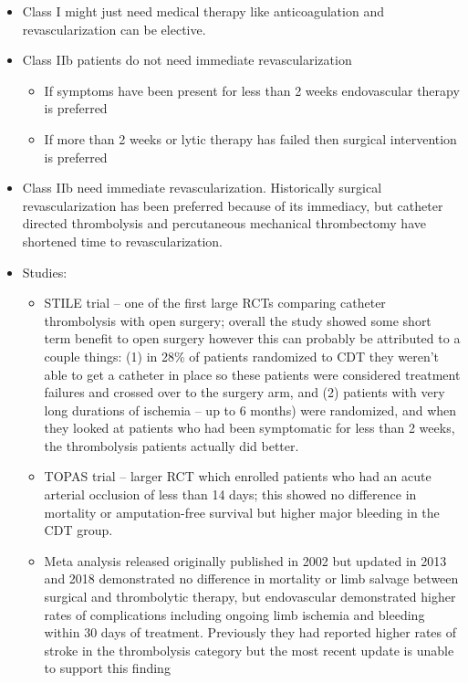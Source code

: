 \documentclass[
]{book}
\begin{document}
\begin{itemize}
\item
  Class I might just need medical therapy like anticoagulation and
  revascularization can be elective.~
\item
  Class IIb patients do not need immediate revascularization

  \begin{itemize}
  \item
    If symptoms have been present for less than 2 weeks endovascular
    therapy is preferred
  \item
    If more than 2 weeks or lytic therapy has failed then surgical
    intervention is preferred~
  \end{itemize}
\item
  Class IIb need immediate revascularization. Historically surgical
  revascularization has been preferred because of its immediacy, but
  catheter directed thrombolysis and percutaneous mechanical
  thrombectomy have shortened time to revascularization.~
\item
  Studies:

  \begin{itemize}
  \item
    STILE trial -- one of the first large RCTs comparing catheter
    thrombolysis with open surgery; overall the study showed some
    short term benefit to open surgery however this can probably be
    attributed to a couple things: (1) in 28\% of patients randomized
    to CDT they weren't able to get a catheter in place so these
    patients were considered treatment failures and crossed over to
    the surgery arm, and (2) patients with very long durations of
    ischemia -- up to 6 months) were randomized, and when they
    looked at patients who had been symptomatic for less than 2
    weeks, the thrombolysis patients actually did better.
    \citep{thestileinvestigatorsResultsProspectiveRandomized1994}
  \item
    TOPAS trial -- larger RCT which enrolled patients who had an
    acute arterial occlusion of less than 14 days; this showed no
    difference in mortality or amputation-free survival but higher
    major bleeding in the CDT group.
    \citep{ourielComparisonRecombinantUrokinase1998}
  \item
    Meta analysis released originally published in 2002 but updated
    in 2013 and 2018 demonstrated no difference in mortality or limb
    salvage between surgical and thrombolytic therapy, but
    endovascular demonstrated higher rates of complications
    including ongoing limb ischemia and bleeding within 30 days of
    treatment. Previously they had reported higher rates of stroke
    in the thrombolysis category but the most recent update is
    unable to support this finding
    \citep{darwoodSurgeryThrombolysisInitial2018}


\end{itemize}
\end{itemize}
\end{document}

